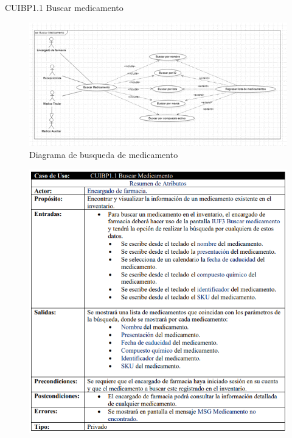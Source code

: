 \documentclass[12pt,letterpaper]{article}
\begin{document}
            \newpage
            CUIBP1.1 Buscar medicamento 
            \begin{figure}[H]
                \centering
                \includegraphics [scale=0.5]{casosUso/buscarMedicamentos}
                \caption{Diagrama de busqueda de medicamento}
            \end{figure}
            \begin{figure}[H]
                \centering
                \includegraphics [scale=0.8]{specs/specBuscarMedicamento}
            \end{figure}
\end{document}
